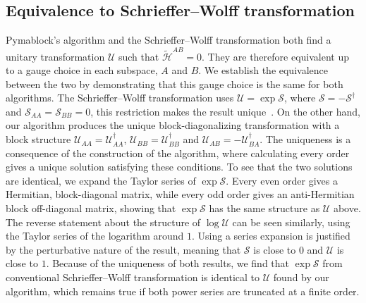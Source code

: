 \subsection{Equivalence to Schrieffer--Wolff transformation}
\label{seq:SW_equivalence}
Pymablock's algorithm and the Schrieffer--Wolff transformation both find a unitary transformation $\mathcal{U}$ such that $\tilde{\mathcal{H}}^{AB}=0$.
They are therefore equivalent up to a gauge choice in each subspace, $A$ and $B$.
We establish the equivalence between the two by demonstrating that this gauge choice is the same for both algorithms.
The Schrieffer--Wolff transformation uses $\mathcal{U} = \exp \mathcal{S}$, where $\mathcal{S} = -\mathcal{S}^\dagger$ and $\mathcal{S}_{AA} = \mathcal{S}_{BB} = 0$, this restriction makes the result unique~\cite{Bravyi_2011}.
On the other hand, our algorithm produces the unique block-diagonalizing transformation with a block structure $\mathcal{U}_{AA} = \mathcal{U}_{AA}^{\dag}$, $\mathcal{U}_{BB} = \mathcal{U}_{BB}^{\dag}$ and $\mathcal{U}_{AB} = -\mathcal{U}_{BA}^{\dag}$.
The uniqueness is a consequence of the construction of the algorithm, where calculating every order gives a unique solution satisfying these conditions.
To see that the two solutions are identical, we expand the Taylor series of $\exp \mathcal{S}$.
Every even order gives a Hermitian, block-diagonal matrix, while every odd order gives an anti-Hermitian block off-diagonal matrix, showing that $\exp \mathcal{S}$ has the same structure as $\mathcal{U}$ above.
The reverse statement about the structure of $\log \mathcal{U}$ can be seen similarly, using the Taylor series of the logarithm around $1$.
Using a series expansion is justified by the perturbative nature of the result, meaning that $\mathcal{S}$ is close to $0$ and $\mathcal{U}$ is close to $1$.
Because of the uniqueness of both results, we find that $\exp \mathcal{S}$ from conventional Schrieffer--Wolff transformation is identical to $\mathcal{U}$ found by our algorithm, which remains true if both power series are truncated at a finite order.

